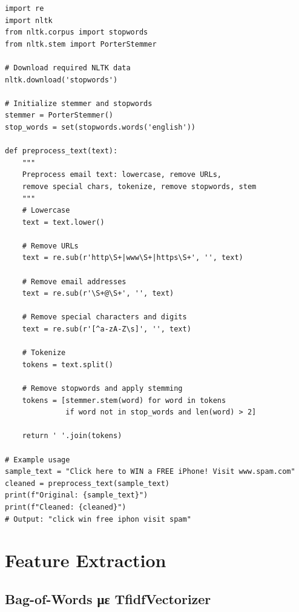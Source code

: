 \documentclass[12pt,a4paper,twoside]{book}
\begin{document}
\begin{tcolorbox}[myCustomStyle={Text Preprocessing Pipeline}]
    \begin{lstlisting}[style=myPythonStyle]
import re
import nltk
from nltk.corpus import stopwords
from nltk.stem import PorterStemmer

# Download required NLTK data
nltk.download('stopwords')

# Initialize stemmer and stopwords
stemmer = PorterStemmer()
stop_words = set(stopwords.words('english'))

def preprocess_text(text):
    """
    Preprocess email text: lowercase, remove URLs,
    remove special chars, tokenize, remove stopwords, stem
    """
    # Lowercase
    text = text.lower()
    
    # Remove URLs
    text = re.sub(r'http\S+|www\S+|https\S+', '', text)
    
    # Remove email addresses
    text = re.sub(r'\S+@\S+', '', text)
    
    # Remove special characters and digits
    text = re.sub(r'[^a-zA-Z\s]', '', text)
    
    # Tokenize
    tokens = text.split()
    
    # Remove stopwords and apply stemming
    tokens = [stemmer.stem(word) for word in tokens 
              if word not in stop_words and len(word) > 2]
    
    return ' '.join(tokens)

# Example usage
sample_text = "Click here to WIN a FREE iPhone! Visit www.spam.com"
cleaned = preprocess_text(sample_text)
print(f"Original: {sample_text}")
print(f"Cleaned: {cleaned}")
# Output: "click win free iphon visit spam"
\end{lstlisting}
\end{tcolorbox}

\section{Feature Extraction}

\subsection{Bag-of-Words με TfidfVectorizer}
\end{document}
